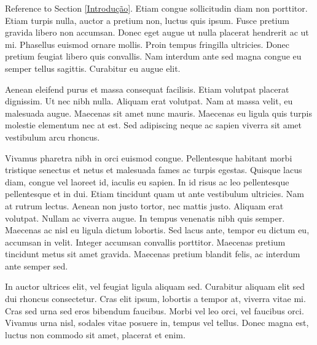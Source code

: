 \documentclass[preprint,12pt,times]{elsarticle}
\begin{document}
	Reference to Section \ref{Introdução}. Etiam congue sollicitudin diam non porttitor. Etiam turpis nulla, auctor a pretium non, luctus quis ipsum. Fusce pretium gravida libero non accumsan. Donec eget augue ut nulla placerat hendrerit ac ut mi. Phasellus euismod ornare mollis. Proin tempus fringilla ultricies. Donec pretium feugiat libero quis convallis. Nam interdum ante sed magna congue eu semper tellus sagittis. Curabitur eu augue elit.

	Aenean eleifend purus et massa consequat facilisis. Etiam volutpat placerat dignissim. Ut nec nibh nulla. Aliquam erat volutpat. Nam at massa velit, eu malesuada augue. Maecenas sit amet nunc mauris. Maecenas eu ligula quis turpis molestie elementum nec at est. Sed adipiscing neque ac sapien viverra sit amet vestibulum arcu rhoncus.

	Vivamus pharetra nibh in orci euismod congue. Pellentesque habitant morbi tristique senectus et netus et malesuada fames ac turpis egestas. Quisque lacus diam, congue vel laoreet id, iaculis eu sapien. In id risus ac leo pellentesque pellentesque et in dui. Etiam tincidunt quam ut ante vestibulum ultricies. Nam at rutrum lectus. Aenean non justo tortor, nec mattis justo. Aliquam erat volutpat. Nullam ac viverra augue. In tempus venenatis nibh quis semper. Maecenas ac nisl eu ligula dictum lobortis. Sed lacus ante, tempor eu dictum eu, accumsan in velit. Integer accumsan convallis porttitor. Maecenas pretium tincidunt metus sit amet gravida. Maecenas pretium blandit felis, ac interdum ante semper sed.

	In auctor ultrices elit, vel feugiat ligula aliquam sed. Curabitur aliquam elit sed dui rhoncus consectetur. Cras elit ipsum, lobortis a tempor at, viverra vitae mi. Cras sed urna sed eros bibendum faucibus. Morbi vel leo orci, vel faucibus orci. Vivamus urna nisl, sodales vitae posuere in, tempus vel tellus. Donec magna est, luctus non commodo sit amet, placerat et enim.

	
	
\end{document}
